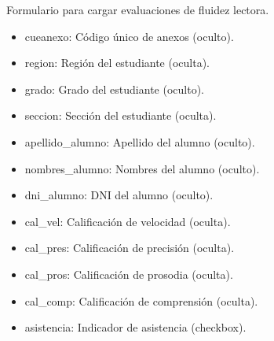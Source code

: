 \documentclass[letterpaper,10pt,spanish]{sphinxmanual}
\begin{document}
\begin{fulllineitems}

\pysigstartsignatures
{}
\pysigstopsignatures
\sphinxAtStartPar
Formulario para cargar evaluaciones de fluidez lectora.
\begin{description}
\begin{itemize}
\item {} 
\sphinxAtStartPar
cueanexo: Código único de anexos (oculto).

\item {} 
\sphinxAtStartPar
region: Región del estudiante (oculta).

\item {} 
\sphinxAtStartPar
grado: Grado del estudiante (oculto).

\item {} 
\sphinxAtStartPar
seccion: Sección del estudiante (oculta).

\item {} 
\sphinxAtStartPar
apellido\_alumno: Apellido del alumno (oculto).

\item {} 
\sphinxAtStartPar
nombres\_alumno: Nombres del alumno (oculto).

\item {} 
\sphinxAtStartPar
dni\_alumno: DNI del alumno (oculto).

\item {} 
\sphinxAtStartPar
cal\_vel: Calificación de velocidad (oculta).

\item {} 
\sphinxAtStartPar
cal\_pres: Calificación de precisión (oculta).

\item {} 
\sphinxAtStartPar
cal\_pros: Calificación de prosodia (oculta).

\item {} 
\sphinxAtStartPar
cal\_comp: Calificación de comprensión (oculta).

\item {} 
\sphinxAtStartPar
asistencia: Indicador de asistencia (checkbox).

\end{itemize}


\end{description}
\end{fulllineitems}
\end{document}
